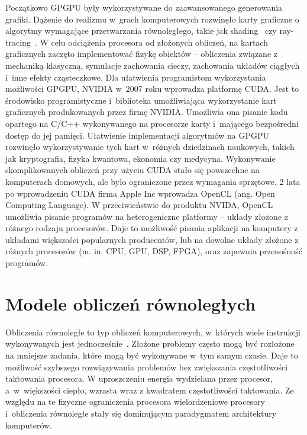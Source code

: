 Początkowo GPGPU były wykorzystywane do zaawansowanego generowania grafiki. Dążenie do realizmu w~grach komputerowych rozwinęło karty graficzne o algorytmy wymagające przetwarzania równoległego, takie jak shading~\cite{b18} czy ray-tracing~\cite{b3}. W celu odciążenia procesora od złożonych obliczeń, na kartach graficznych zaczęto implementować fizykę obiektów – obliczenia związane z mechaniką klasyczną, symulacje zachowania cieczy, zachowania układów ciągłych i~inne efekty cząsteczkowe. Dla ułatwienia programistom wykorzystania możliwości GPGPU, NVIDIA w~2007 roku wprowadza platformę CUDA. Jest to środowisko programistyczne i~biblioteka umożliwiająca wykorzystanie kart graficznych produkowanych przez firmę NVIDIA. Umożliwia ona pisanie kodu opartego na C/C++ wykonywanego na procesorze karty i~mającego bezpośredni dostęp do jej pamięci. Ułatwienie implementacji algorytmów na GPGPU rozwinęło wykorzystywanie tych kart w~różnych dziedzinach naukowych, takich jak kryptografia, fizyka kwantowa, ekonomia czy medycyna. Wykonywanie  skomplikowanych obliczeń przy użyciu CUDA stało się powszechne na komputerach domowych, ale było ograniczone przez wymagania sprzętowe. 2 lata po wprowadzeniu CUDA firma Apple Inc wprowadza OpenCL (ang. Open Computing Language). W przeciwieństwie do produktu NVIDA, OpenCL umożliwia pisanie programów na heterogeniczne platformy – układy złożone z różnego rodzaju procesorów. Daje to możliwość pisania aplikacji na komputery z układami większości popularnych producentów, lub  na dowolne układy złożone z różnych procesorów (m. in. CPU, GPU, DSP, FPGA), oraz zapewnia przenośność programów.


\section{Modele obliczeń równoległych}\label{sec:Paralellism}

Obliczenia równoległe to typ obliczeń komputerowych, w~których wiele instrukcji wykonywanych jest jednocześnie~\cite{b14}. Złożone problemy często mogą być rozłożone na mniejsze zadania, które mogą być wykonywane w~tym samym czasie. Daje to możliwość szybszego rozwiązywania problemów bez zwiększania częstotliwości taktowania procesora. W uproszczeniu energia wydzielana przez procesor, a~w~większości ciepło, wzrasta wraz z kwadratem częstotliwości taktowania. Ze względu na te fizyczne ograniczenia procesora wielordzeniowe procesory i~obliczenia równoległe stały się dominującym paradygmatem architektury komputerów.

